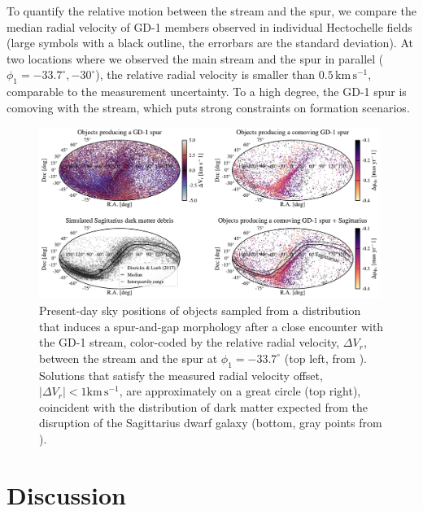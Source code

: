 \documentclass[twocolumn]{aastex63}
\newcommand{\kms}{\ensuremath{\textrm{km}\,\textrm{s}^{-1}}}
\begin{document}
To quantify the relative motion between the stream and the spur, we compare the median radial velocity of GD-1 members observed in individual Hectochelle fields (large symbols with a black outline, the errorbars are the standard deviation).
At two locations where we observed the main stream and the spur in parallel ($\phi_1=-33.7^\circ, -30^\circ$), the relative radial velocity is smaller than $0.5\,\kms$, comparable to the measurement uncertainty.
To a high degree, the GD-1 spur is comoving with the stream, which puts strong constraints on formation scenarios.


\begin{figure}
\begin{center}
\includegraphics[width=0.99\textwidth]{skybox.pdf}
\end{center}
\caption{Present-day sky positions of objects sampled from a distribution that induces a spur-and-gap morphology after a close encounter with the GD-1 stream, color-coded by the relative radial velocity, $\Delta V_r$, between the stream and the spur at $\phi_1=-33.7^\circ$ (top left, from \citealt{bonaca2019a}).
Solutions that satisfy the measured radial velocity offset, $|\Delta V_r|<1\kms$, are approximately on a great circle (top right), coincident with the distribution of dark matter expected from the disruption of the Sagittarius dwarf galaxy (bottom, gray points from \citealt{dl2017}).
}
\label{fig:skybox}
\end{figure}

\section{Discussion}
\label{sec:discussion}
\end{document}
